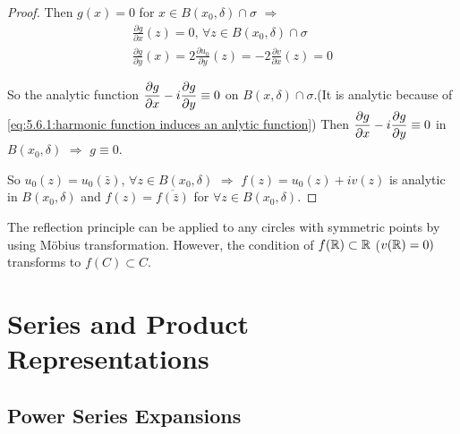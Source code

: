 \begin{proof}
    Then  $ g(x)=0 $ for  $ x\in B(x_0,\delta)\cap \sigma $ $ \Rightarrow  $ 
    \begin{align*}
        \frac{\partial g}{\partial x}(z)=0,\,\forall z\in B(x_0,\delta)\cap\sigma\\
        \frac{\partial g}{\partial y}(x)=2\frac{\partial u_0}{\partial y}(z)=-2\frac{\partial v}{\partial x}(z)=0
    \end{align*}  

    So the analytic function  $ \displaystyle\frac{\partial g}{\partial x}-i\frac{\partial g}{\partial y}\equiv 0 $ on   $ B(x,\delta)\cap \sigma $.(It is analytic because of \eqref{eq:5.6.1:harmonic function induces an anlytic function}) Then  $ \displaystyle\frac{\partial g}{\partial x}-i\frac{\partial g}{\partial y}\equiv 0 $  in  $ B(x_0,\delta) $ $ \Rightarrow  $   $ g\equiv 0 $.
    
    So  $ u_0(z)=u_0(\bar{z}) $,  $ \forall z\in B(x_0,\delta) $  $ \Rightarrow  $  $ f(z)=u_0(z)+i v(z) $ is analytic in  $ B(x_0,\delta) $ and  $ f(z)=\overline{f(\bar{z})} $ for  $ \forall z\in B(x_0,\delta) $.



\end{proof}

\begin{remark}
    The reflection principle can be applied to any circles with symmetric points by using M{\"o}bius transformation. However, the condition of $ f(\mathbb R)\subset \mathbb R $ (\ie  $ v(\mathbb R)=0) $ transforms to  $ f(C)\subset C $. 
\end{remark}

\section{Series and Product Representations}
\subsection{Power Series Expansions}
